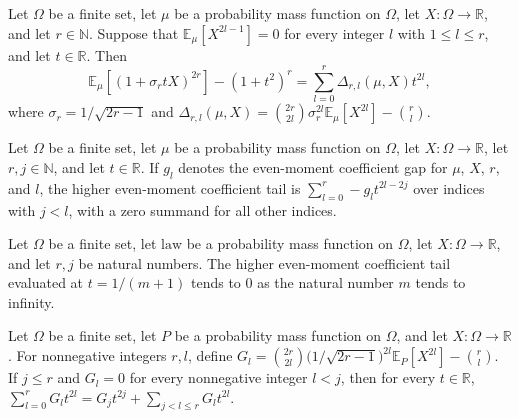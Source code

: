 \begin{theorem}
\label{FABL.affine_evenMoment_sub_eq_coefficientGap_sum}
\leanok
{}
Let $\Omega$ be a finite set, let $\mu$ be a probability mass function on $\Omega$, let
$X:\Omega\to\mathbb R$, and let $r\in\mathbb N$. Suppose that $\mathbb
E_\mu[X^{2l-1}]=0$ for every integer $l$ with $1\le l\le r$, and let $t\in\mathbb R$.
Then
\[
\mathbb E_\mu\!\left[(1+\sigma_r tX)^{2r}\right]-(1+t^2)^r
=\sum_{l=0}^{r}\Delta_{r,l}(\mu,X)t^{2l},
\]
where $\sigma_r=1/\sqrt{2r-1}$ and
$\Delta_{r,l}(\mu,X)=\binom{2r}{2l}\sigma_r^{2l}\mathbb E_\mu[X^{2l}]-\binom rl$.
\end{theorem}

\begin{definition}
\label{FABL.higherEvenMomentCoefficientTail}
\leanok
{}
Let $\Omega$ be a finite set, let $\mu$ be a probability mass function on $\Omega$, let
$X\colon\Omega\to\mathbb R$, let $r,j\in\mathbb N$, and let $t\in\mathbb R$. If $g_l$
denotes the even-moment coefficient gap for $\mu$, $X$, $r$, and $l$, the higher
even-moment coefficient tail is $\sum_{l=0}^{r} -g_l t^{2l-2j}$ over indices with $j<l$,
with a zero summand for all other indices.
\end{definition}

\begin{theorem}
\label{FABL.higherEvenMomentCoefficientTail_tendsto_zero}
\leanok
{}
Let $\Omega$ be a finite set, let $\mathrm{law}$ be a probability mass function on
$\Omega$, let $X:\Omega\to\mathbb R$, and let $r,j$ be natural numbers. The higher
even-moment coefficient tail evaluated at $t=1/(m+1)$ tends to $0$ as the natural number
$m$ tends to infinity.
\end{theorem}

\begin{theorem}
\label{FABL.coefficientGap_mul_pow_add_higher}
\leanok
{}
Let $\Omega$ be a finite set, let $P$ be a probability mass function on $\Omega$, and
let $X:\Omega\to\mathbb R$. For nonnegative integers $r,l$, define
$G_l=\binom{2r}{2l}\bigl(1/\sqrt{2r-1}\bigr)^{2l}\mathbb E_P[X^{2l}]-\binom{r}{l}$. If
$j\le r$ and $G_l=0$ for every nonnegative integer $l<j$, then for every $t\in\mathbb
R$, $\sum_{l=0}^{r}G_l t^{2l}=G_jt^{2j}+\sum_{j<l\le r}G_l t^{2l}$.
\end{theorem}

